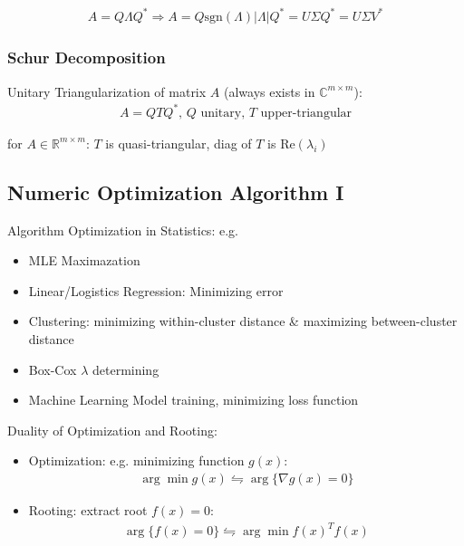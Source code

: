 \begin{align}
    A=Q\Lambda Q^*\Rightarrow  A=Q\mathrm{sgn}(\Lambda )|\Lambda |Q^*=U\Sigma Q^*=U\Sigma V^* 
\end{align}



\subsubsection{Schur Decomposition}
    Unitary Triangularization of matrix $ A $ (always exists in $ \mathbb{C}^{m\times m} $):
    \begin{align}
        A=QTQ^*,\, Q\text{ unitary, }T\text{ upper-triangular} 
    \end{align}
    
    for $ A\in\mathbb{R}^{m\times m} $: $ T $ is quasi-triangular, diag of $ T $ is $ \mathrm{Re} (\lambda _i) $
















\subsection{Numeric Optimization Algorithm I}

Algorithm Optimization in Statistics: e.g.
\begin{itemize}[topsep=2pt,itemsep=0pt]
    \item MLE Maximazation
    \item Linear/Logistics Regression: Minimizing error
    \item Clustering: minimizing within-cluster distance \& maximizing between-cluster distance
    \item Box-Cox $ \lambda  $ determining
    \item Machine Learning Model training, minimizing loss function
\end{itemize}

\begin{point}
Duality of Optimization and Rooting:
\end{point}

\begin{itemize}[topsep=2pt,itemsep=0pt]
    \item Optimization: e.g. minimizing function $ g(x) $:
    \begin{align}
        \arg\min g(x) \leftrightharpoons \arg\{\nabla g(x)=0\}
    \end{align}
    \item Rooting: extract root $ f(x)=0 $:
    \begin{align}
        \arg \{f(x)=0\}\leftrightharpoons \arg\min f(x)^Tf(x) 
    \end{align}   
\end{itemize}

